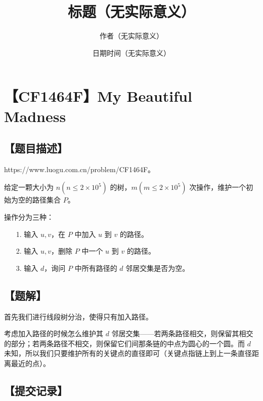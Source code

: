 \documentclass[UTF8,12pt,a4paper]{ctexart}
\title{标题（无实际意义）}
\author{作者（无实际意义）}
\date{日期时间（无实际意义）}
\begin{document}
	\fontsize{12pt}{12pt}\selectfont
	
	\newpage
	\pagestyle{fancy}
	
	
	
	\section*{【CF1464F】My Beautiful Madness}
	
	\subsection*{【题目描述】}
	
	https://www.luogu.com.cn/problem/CF1464F。
	
	给定一颗大小为 $n(n\le2\times 10^5)$ 的树，$m(m\le2\times 10^5)$ 次操作，维护一个初始为空的路径集合 $P$。
	
	操作分为三种：
	
	\begin{itemize}
		\item [1.] 输入 $u,v$，在 $P$ 中加入 $u$ 到 $v$ 的路径。
		\item [2.] 输入 $u,v$，删除 $P$ 中一个 $u$ 到 $v$ 的路径。
		\item [3.] 输入 $d$，询问 $P$ 中所有路径的 $d$ 邻居交集是否为空。
	\end{itemize}
	
	\subsection*{【题解】}
	
	首先我们进行线段树分治，使得只有加入路径。
	
	考虑加入路径的时候怎么维护其 $d$ 邻居交集——若两条路径相交，则保留其相交的部分；若两条路径不相交，则保留它们间那条链的中点为圆心的一个圆。而 $d$ 未知，所以我们只要维护所有的关键点的直径即可（关键点指链上到上一条直径距离最近的点）。
	
	
	\subsection*{【提交记录】}
	
\end{document}
